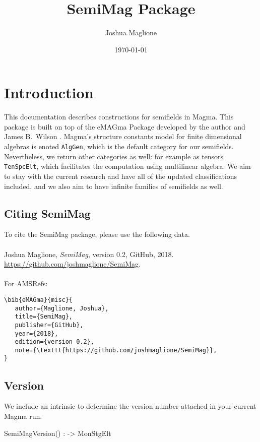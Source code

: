 \documentclass{documentation}
\title{SemiMag Package}
\author{Joshua Maglione}
\date{\today}
\begin{document}
\frontmatter

\dominitoc
\maketitle
\tableofcontents

\mainmatter

\chapter{Introduction}

This documentation describes constructions for semifields in Magma. 
This package is built on top of the eMAGma Package developed by the author and James B.\ Wilson \cite{eMAGma}. 
Magma's structure constants model for finite dimensional algebras is enoted \texttt{AlgGen}, which is the default category for our semifields. 
Nevertheless, we return other categories as well: for example as tensors \texttt{TenSpcElt}, which facilitates the computation using multilinear algebra.
We aim to stay with the current research and have all of the updated classifications included, and we also aim to have infinite families of semifields as well. 


\bigskip

\section{Citing SemiMag} 
To cite the SemiMag package, please use the following data.\\
\\
Joshua Maglione, \emph{SemiMag}, version 0.2, GitHub, 2018. \url{https://github.com/joshmaglione/SemiMag}. \\
\\
For AMSRefs:
\begin{verbatim}
\bib{eMAGma}{misc}{
   author={Maglione, Joshua},
   title={SemiMag},
   publisher={GitHub},
   year={2018},
   edition={version 0.2},
   note={\texttt{https://github.com/joshmaglione/SemiMag}},
}
\end{verbatim}

\section{Version}

We include an intrinsic to determine the version number attached in your current Magma run.

\begin{intrinsics}
SemiMagVersion() : -> MonStgElt
\end{intrinsics}
\end{document}
